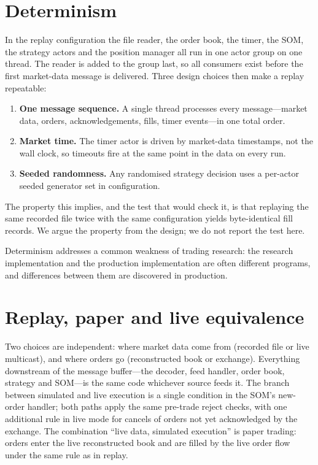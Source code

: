 \section{Determinism}
\label{sec:kaspar-determinism}

In the replay configuration the file reader, the order book, the timer, the SOM, the strategy
actors and the position manager all run in one actor group on one thread. The reader is added to
the group last, so all consumers exist before the first market-data message is delivered. Three
design choices then make a replay repeatable:
\begin{enumerate}[leftmargin=1.5em]
\item \textbf{One message sequence.} A single thread processes every message---market data, orders,
  acknowledgements, fills, timer events---in one total order.
\item \textbf{Market time.} The timer actor is driven by market-data timestamps, not the wall
  clock, so timeouts fire at the same point in the data on every run.
\item \textbf{Seeded randomness.} Any randomised strategy decision uses a per-actor seeded
  generator set in configuration.
\end{enumerate}
The property this implies, and the test that would check it, is that replaying the same recorded
file twice with the same configuration yields byte-identical fill records. We argue the property
from the design; we do not report the test here.

Determinism addresses a common weakness of trading research: the research implementation and the
production implementation are often different programs, and differences between them are
discovered in production.

\section{Replay, paper and live equivalence}
\label{sec:kaspar-equivalence}

Two choices are independent: where market data come from (recorded file or live multicast), and
where orders go (reconstructed book or exchange). Everything downstream of the message buffer---the
decoder, feed handler, order book, strategy and SOM---is the same code whichever source feeds it.
The branch between simulated and live execution is a single condition in the SOM's new-order
handler; both paths apply the same pre-trade reject checks, with one additional rule in live mode
for cancels of orders not yet acknowledged by the exchange. The combination ``live data, simulated
execution'' is paper trading: orders enter the live reconstructed book and are filled by the live
order flow under the same rule as in replay.

